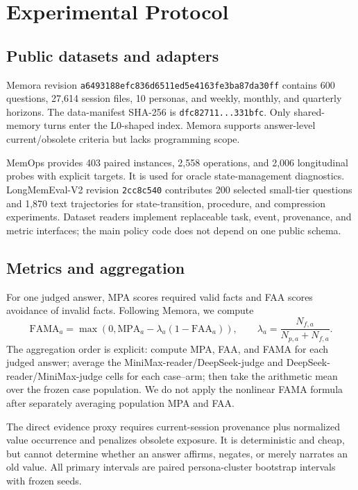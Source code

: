 \documentclass[10pt]{article}
\begin{document}
\section{Experimental Protocol}

\subsection{Public datasets and adapters}

Memora revision \texttt{a6493188efc836d6511ed5e4163fe3ba87da30ff} contains 600 questions, 27,614 session files, 10 personas, and weekly, monthly, and quarterly horizons. The data-manifest SHA-256 is \texttt{dfc82711...331bfc}. Only shared-memory turns enter the L0-shaped index. Memora supports answer-level current/obsolete criteria but lacks programming scope.

MemOps provides 403 paired instances, 2,558 operations, and 2,006 longitudinal probes with explicit targets. It is used for oracle state-management diagnostics. LongMemEval-V2 revision \texttt{2cc8c540} contributes 200 selected small-tier questions and 1,870 text trajectories for state-transition, procedure, and compression experiments. Dataset readers implement replaceable task, event, provenance, and metric interfaces; the main policy code does not depend on one public schema.

\subsection{Metrics and aggregation}

For one judged answer, MPA scores required valid facts and FAA scores avoidance of invalid facts. Following Memora, we compute
\[
\mathrm{FAMA}_a=\max\left(0,\mathrm{MPA}_a-\lambda_a(1-\mathrm{FAA}_a)\right),
\qquad
\lambda_a=\frac{N_{f,a}}{N_{p,a}+N_{f,a}}.
\]
The aggregation order is explicit: compute MPA, FAA, and FAMA for each judged answer; average the MiniMax-reader/DeepSeek-judge and DeepSeek-reader/MiniMax-judge cells for each case--arm; then take the arithmetic mean over the frozen case population. We do not apply the nonlinear FAMA formula after separately averaging population MPA and FAA.

The direct evidence proxy requires current-session provenance plus normalized value occurrence and penalizes obsolete exposure. It is deterministic and cheap, but cannot determine whether an answer affirms, negates, or merely narrates an old value. All primary intervals are paired persona-cluster bootstrap intervals with frozen seeds.
\end{document}
